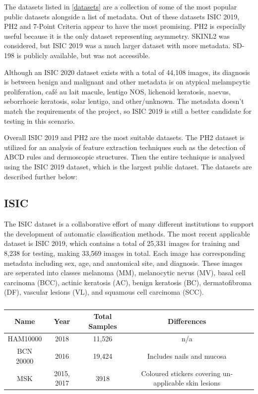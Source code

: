 The datasets listed in \ref{datasets} are a collection of some of the most popular public datasets alongside a list of metadata.  Out of these datasets ISIC 2019, PH2 and 7-Point Criteria appear to have the most promising. PH2 is especially useful because it is the only dataset representing asymmetry. SKINL2 was considered, but ISIC 2019 was a much larger dataset with more metadata. SD-198 is publicly available, but was not accessible.

Although an ISIC 2020 dataset exists with a total of 44,108 images, its diagnosis is between benign and malignant and other metadata is on atypical melampcytic proliferation, café au lait macule, lentigo NOS, lichenoid keratosis, naevus, seborrhoeic keratosis, solar lentigo, and other/unknown. The metadata doesn't match the requirements of the project, so ISIC 2019 is still a better candidate for testing in this scenario.

Overall ISIC 2019 and PH2 are the most suitable datasets. The PH2 dataset is utilized for an analysis of feature extraction techniques such as the detection of ABCD rules and dermoscopic structures. Then the entire technique is analysed using the ISIC 2019 dataset, which is the largest public dataset. The datasets are described further below:


\subsection{ISIC}
The ISIC dataset is a collaborative effort of many different institutions to support the development of automatic classification methods. The most recent applicable dataset is ISIC 2019, which contains a total of 25,331 images for training and 8,238 for testing, making 33,569 images in total. Each image has corresponding metadata including sex, age, and anatomical site, and diagnosis. These images are seperated into classes melanoma (MM), melanocytic nevus (MV), basal cell carcinoma (BCC), actinic keratosis (AC), benign keratosis (BC), dermatofibroma (DF), vascular  lesions (VL), and squamous cell carcinoma (SCC). 

\begin{table}
	\small
	\begin{tabular}{|c|c|c|c|c|}
		\hline
		Name & Year & Total Samples & Differences \\
		\hline
		HAM10000 & 2018 & 11,526 & n/a
		\\
		\hline
		BCN 20000 & 2016 & 19,424 & Includes nails and mucosa
		\\
		\hline
		MSK & 2015, 2017 & 3918 & Coloured stickers covering un-applicable skin lesions
		\\
		\hline	
	\end{tabular}
	\caption{}
\end{table} \label{ISIC_AF}

